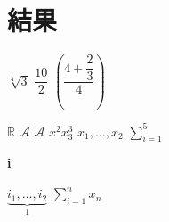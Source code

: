 \documentclass[../../../main]{subfiles}
\begin{document}
\section{結果}


\( \sqrt[4]{3} \)
\( \dfrac{10}{2}  \)
\( \left( \dfrac{4+\dfrac{2}{3}}{4}   \right) \)

\( \mathbb{R} \)
\( \mathcal{A} \)
\( \mathscr{A} \)
\( x ^2 x_{3} ^3  \)
\( x_1, \ldots, x_2 \)
\( \sum_{i=1}^{5}  \)

\textbf{i}

\( \underbrace{i_{1}, \ldots, i_{2} }_{1}   \)
\( \displaystyle \sum_{i=1}^{n} x_{n}   \)
\end{document}
